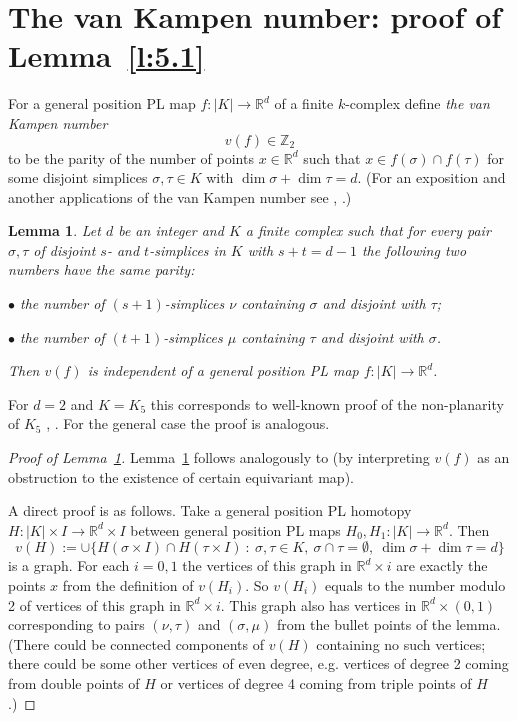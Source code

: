 \documentclass[runningheads]{llncs}
\newtheorem{lemma}[theorem]{Lemma}
\theoremstyle{remark}
\theoremstyle{definition}
\newcommand{\R}{\mathbb{R}}
\newcommand{\Z}{\mathbb{Z}}
\begin{document}
{\section{The van Kampen number: proof of Lemma~\ref{l:5.1}}\label{s:elem}

For a  general position PL map $f\colon |K|\to \R^d$  of a finite $k$-complex define {\it the van Kampen number}
$$v(f)\in\Z_2$$
to be the parity of the number of points $x\in \R^d$ such that $x\in f(\sigma) \cap f(\tau)$ for some disjoint simplices $\sigma, \tau \in  K$ with $\dim \sigma + \dim \tau = d$.
(For an exposition and another applications of the van Kampen number see
\cite{Sk17}, \cite[\S1]{Sk}.)

\begin{lemma}\label{l:pa}
Let $d$ be an integer and $K$ a finite complex such that for every pair $\sigma, \tau$ of disjoint $s$- and $t$-simplices in $K$ with $s+t=d-1$ the following two numbers have the same parity:

$\bullet$ the number of $(s+1)$-simplices $\nu$ containing $\sigma$ and disjoint with $\tau$;

$\bullet$ the number of $(t+1)$-simplices $\mu$ containing $\tau$ and disjoint with $\sigma$.

Then $v(f)$ is independent of a general position PL map $f\colon |K|\to \R^d$.
\end{lemma}

For $d=2$ and $K=K_5$ this corresponds to well-known proof of the non-planarity of $K_5$ \cite[Lemma 3.4]{Sk}, \cite[\S5]{BE82}.
For the general case the proof is analogous.

\begin{proof}[Proof of Lemma~\ref{l:pa}] Lemma~\ref{l:pa} follows analogously to \cite[Lemma 3.5]{Sh57} (by interpreting $v(f)$ as an obstruction to the existence of certain equivariant map).

A direct proof is as follows.
Take a general position PL homotopy $H:|K|\times I\to\R^d\times I$ between general position PL maps $H_0,H_1:|K|\to\R^d$.
Then
$$v(H):=\cup\{H(\sigma\times I)\cap H(\tau\times I)\ :\ \sigma,\tau\in K,\ \sigma\cap\tau=\emptyset,\ \dim\sigma+\dim\tau=d\}$$
is a graph.
For each $i=0,1$ the vertices of this graph in $\R^d\times i$ are exactly the points $x$ from the definition of $v(H_i)$.
So $v(H_i)$ equals to the number modulo 2 of vertices of this graph in $\R^d\times i$.
This graph also has vertices in $\R^d\times(0,1)$ corresponding to pairs $(\nu,\tau)$ and $(\sigma,\mu)$
from the bullet points of the lemma.
(There could be connected components of $v(H)$ containing no such vertices;
there could be some other vertices of even degree, e.g. vertices of degree 2 coming from double points of $H$ or
vertices of degree 4 coming from triple points of $H$.)


\end{proof}}
\end{document}
